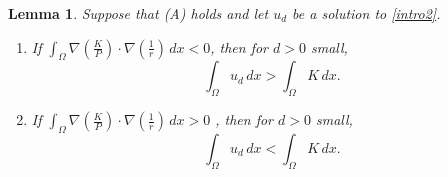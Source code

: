 \documentclass[11pt]{article}
\newcommand{\parentheses}[1]{\left(#1\right)}
\newtheorem{lemma}[statement]{Lemma}
\theoremstyle{definition}
\theoremstyle{remark}
\begin{document}
\begin{lemma}%
 \label{Lemma 1}
 Suppose that (A) holds and let $u_d$ be a solution to \eqref{intro2}.
    \begin{enumerate}
        \item If $\displaystyle\int_\Omega\nabla\parentheses{\frac{K}{P}}\cdot\nabla \parentheses{\frac{1}{r}}\,dx<0$, then for $d>0$ small, 
        \begin{equation*}
            \int_\Omega u_d\,dx > \int_\Omega K\,dx.
        \end{equation*}

        \item If $\displaystyle\int_\Omega\nabla\parentheses{\frac{K}{P}}\cdot\nabla \parentheses{\frac{1}{r}}\,dx>0$ , then for $d>0$ small, 
        \begin{equation*}
            \int_\Omega u_d\,dx <\int_\Omega K\,dx.
        \end{equation*}

    \end{enumerate}
\end{lemma}
\end{document}
